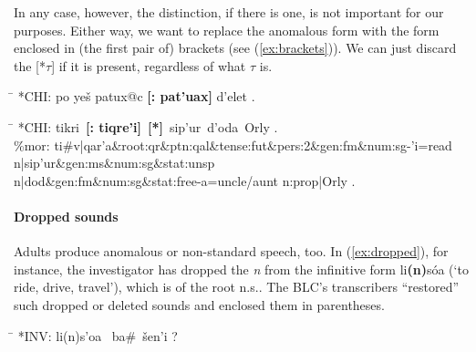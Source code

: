 In any case, however, the distinction, if there is one, is not important for our purposes. 
Either way, we want to replace the anomalous form with the form enclosed in 
(the first pair of) brackets (see (\ref{ex:brackets})). We can just discard the \textsf{[*$\tau$]} 
if it is present, regardless of what $\tau$ is.

\begin{exe}
\label{ex:brackets}
\ex \begin{xlist} 
   \ex\label{ex:repl1} \begin{tabbing}  
	\hspace{0.6in} \= \hspace{5.5in} \kill
	\textsf{*\ac{CH}I:} \> \textsf{po ye\v{s} patux@c \textbf{[: pat\a'{u}ax]} d\a'{e}let .}
	\end{tabbing}
     \ex\label{ex:repl2} \begin{tabbing}
	\hspace{0.6in} \= \hspace{5.5in} \kill
	\textsf{*\ac{CH}I:} \> \textsf{tikri \,\textbf{[: tiqre\a'{i}]}\, \textbf{[*]}\, 
	sip\a'{u}r\, d\a'{o}da\, Orly .} \\
	\textsf{\%mor:} \> \textsf{ti\#v|qar\a'{a}\&root:qr\&ptn:qal\&tense:fut\&pers:2\&gen:fm\&num:sg-\a'{i}=read} \\
                    \> \textsf{n|sip\a'{u}r\&gen:ms\&num:sg\&stat:unsp } \\
                    \> \textsf{n|dod\&gen:fm\&num:sg\&stat:free-a=uncle/aunt} \textsf{n:prop|Orly .}
	\end{tabbing}
   \end{xlist}
\end{exe}

\paragraph{Dropped sounds}
Adults produce anomalous or non-standard speech, too. In (\ref{ex:dropped}), for instance, the investigator 
has dropped the 
\emph{n} from the infinitive form 
\textsf{li\textbf{(n)}s\'oa} (`to ride, drive, travel'), 
which is of the root n.s.. 
The \ac{BLC}'s transcribers ``restored'' such dropped or deleted sounds and enclosed them in parentheses.
\begin{exe} \label{ex:dropped}
\ex \begin{tabbing}
\hspace{0.6in} \= \hspace{5.5in} \kill
\textsf{*INV:} \> \textsf{li(n)s\a'{o}a \, ba\#\, \v{s}en\a'{i} ?}
\end{tabbing}
\end{exe}

